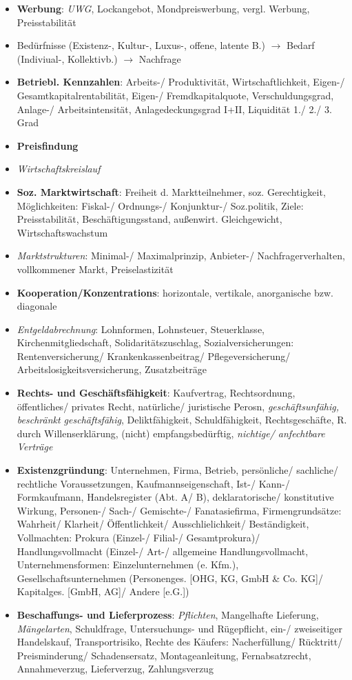 \begin{itemize}
	\item {\bf Werbung}: {\it UWG}, Lockangebot, Mondpreiswerbung, vergl. Werbung, Preisstabilität
	\item Bedürfnisse (Existenz-, Kultur-, Luxus-, offene, latente B.) $\to$ Bedarf (Indiviual-, Kollektivb.) $\to$ Nachfrage
	\item {\bf Betriebl. Kennzahlen}: Arbeits-/ Produktivität, Wirtschaftlichkeit, Eigen-/ Gesamtkapitalrentabilität, Eigen-/ Fremdkapitalquote, Verschuldungsgrad, Anlage-/ Arbeitsintensität, Anlagedeckungsgrad I+II, Liquidität 1./ 2./ 3. Grad
	\item {\bf Preisfindung}
	\item {\it Wirtschaftskreislauf}
	\item {\bf Soz. Marktwirtschaft}: Freiheit d. Marktteilnehmer, soz. Gerechtigkeit, Möglichkeiten: Fiskal-/ Ordnungs-/ Konjunktur-/ Soz.politik, Ziele: Preisstabilität, Beschäftigungsstand, außenwirt. Gleichgewicht, Wirtschaftswachstum
	\item {\it Marktstrukturen}: Minimal-/ Maximalprinzip, Anbieter-/ Nachfragerverhalten, vollkommener Markt, Preiselastizität
	\item {\bf Kooperation/Konzentrations}: horizontale, vertikale, anorganische bzw. diagonale
	\item {\it Entgeldabrechnung}: Lohnformen, Lohnsteuer, Steuerklasse, Kirchenmitgliedschaft, Solidaritätszuschlag, Sozialversicherungen: Rentenversicherung/ Krankenkassenbeitrag/ Pflegeversicherung/ Arbeitslosigkeitsversicherung, Zusatzbeiträge
	\item {\bf Rechts- und Geschäftsfähigkeit}: Kaufvertrag, Rechtsordnung, öffentliches/ privates Recht, natürliche/ juristische Perosn, {\it geschäftsunfähig, beschränkt geschäftsfähig}, Deliktfähigkeit, Schuldfähigkeit, Rechtsgeschäfte, R. durch Willenserklärung, (nicht) empfangsbedürftig, {\it nichtige/ anfechtbare Verträge}
	\item {\bf Existenzgründung}: Unternehmen, Firma, Betrieb, persönliche/ sachliche/ rechtliche Voraussetzungen, Kaufmannseigenschaft, Ist-/ Kann-/ Formkaufmann, Handelsregister (Abt. A/ B), deklaratorische/ konstitutive Wirkung, Personen-/ Sach-/ Gemischte-/ Fanatasiefirma, Firmengrundsätze: Wahrheit/ Klarheit/ Öffentlichkeit/ Ausschlielichkeit/ Beständigkeit, Vollmachten: Prokura (Einzel-/ Filial-/ Gesamtprokura)/ Handlungsvollmacht (Einzel-/ Art-/ allgemeine Handlungsvollmacht, Unternehmensformen: Einzelunternehmen (e. Kfm.), Gesellschaftsunternehmen (Personenges. [OHG, KG, GmbH \& Co. KG]/ Kapitalges. [GmbH, AG]/ Andere [e.G.])
	\item {\bf Beschaffungs- und Lieferprozess}: {\it Pflichten}, Mangelhafte Lieferung, {\it Mängelarten}, Schuldfrage, Untersuchungs- und Rügepflicht, ein-/ zweiseitiger Handelskauf, Transportrisiko, Rechte des Käufers: Nacherfüllung/ Rücktritt/ Preisminderung/ Schadensersatz, Montageanleitung, Fernabsatzrecht, Annahmeverzug, Lieferverzug, Zahlungsverzug 
\end{itemize}

